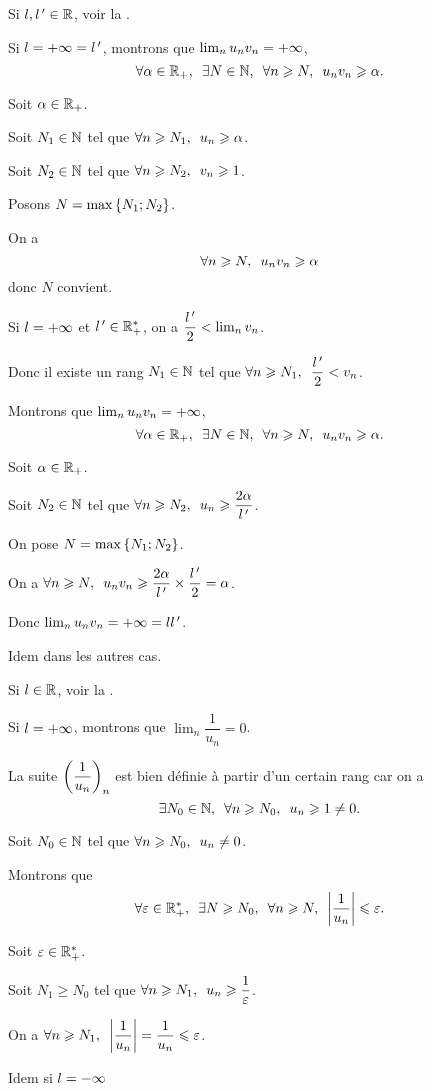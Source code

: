 \begin{dem}[2]
Si \(l,l^{\,\prime}\in\mathbb{R}\), voir la .

Si \(l=+\infty=l^{\,\prime}\), montrons que \(\lim_nu_nv_n=+\infty\), \cad \[\quantifs{\forall\alpha\in\Rp;\exists N\in\N;\forall n\geq N}u_nv_n\geq\alpha.\]

Soit \(\alpha\in\mathbb{R}_+\).

Soit \(N_1\in\mathbb{N}\) tel que \(\quantifs{\forall n\geq N_1}u_n\geq\alpha\).

Soit \(N_2\in\mathbb{N}\) tel que \(\quantifs{\forall n\geq N_2}v_n\geq1\).

Posons \(N=\max\left\lbrace N_1;N_2\right\rbrace\).

On a \[\quantifs{\forall n\geq N}u_nv_n\geq\alpha\] donc \(N\) convient.

Si \(l=+\infty\) et \(l^{\,\prime}\in\mathbb{R}_+^*\), on a \(\dfrac{l^{\,\prime}}{2}<\lim_nv_n\).

Donc il existe un rang \(N_1\in\mathbb{N}\) tel que \(\quantifs{\forall n\geq N_1}\dfrac{l\prim}{2}<v_n\).

Montrons que \(\lim_nu_nv_n=+\infty\), \cad \[\quantifs{\forall\alpha\in\Rp;\exists N\in\N;\forall n\geq N}u_nv_n\geq\alpha.\]

Soit \(\alpha\in\mathbb{R}_+\).

Soit \(N_2\in\mathbb{N}\) tel que \(\quantifs{\forall n\geq N_2}u_n\geq\dfrac{2\alpha}{l\prim}\).

On pose \(N=\max\left\lbrace N_1;N_2\right\rbrace\).

On a \(\quantifs{\forall n\geq N}u_nv_n\geq\dfrac{2\alpha}{l\prim}\times\dfrac{l\prim}{2}=\alpha\).

Donc \(\lim_nu_nv_n=+\infty=ll^{\,\prime}\).

Idem dans les autres cas.
\end{dem}

\begin{dem}[3]
Si \(l\in\mathbb{R}\), voir la .

Si \(l=+\infty\), montrons que \(\lim_n\dfrac{1}{u_n}=0\).

La suite \(\left(\dfrac{1}{u_n}\right)_n\) est bien définie à partir d'un certain rang car on a \[\quantifs{\exists N_0\in\N;\forall n\geq N_0}u_n\geq1\not=0.\]

Soit \(N_0\in\mathbb{N}\) tel que \(\quantifs{\forall n\geq N_0}u_n\not=0\).

Montrons que \[\quantifs{\forall\epsilon\in\Rps;\exists N\geq N_0;\forall n\geq N}\abs{\dfrac{1}{u_n}}\leq\epsilon.\]

Soit \(\varepsilon\in\mathbb{R}_+^*\).

Soit \(N_1\geq N_0\) tel que \(\quantifs{\forall n\geq N_1}u_n\geq\dfrac{1}{\epsilon}\).

On a \(\quantifs{\forall n\geq N_1}\abs{\dfrac{1}{u_n}}=\dfrac{1}{u_n}\leq\epsilon\).

Idem si \(l=-\infty\)
\end{dem}


